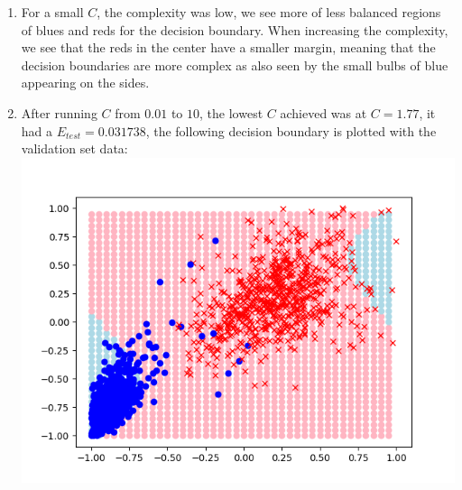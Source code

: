 \documentclass{article}
\begin{document}
\begin{enumerate}
\begin{enumerate}[label=(\alph*)]
        \item For a small $C$, the complexity was low, we see more of less balanced regions of blues and reds for the decision boundary. When increasing the complexity, we see that the reds in the center have a smaller margin, meaning that the decision boundaries are more complex as also seen by the small bulbs of blue appearing on the sides.
        \item After running $C$ from $0.01$ to $10$, the lowest $C$ achieved was at $C = 1.77$, it had a $E_{test} = 0.031738$, the following decision boundary is plotted with the validation set data:\\\includegraphics[scale=0.5]{images/4c.png}
    \end{enumerate}
    \end{enumerate}
\end{document}
